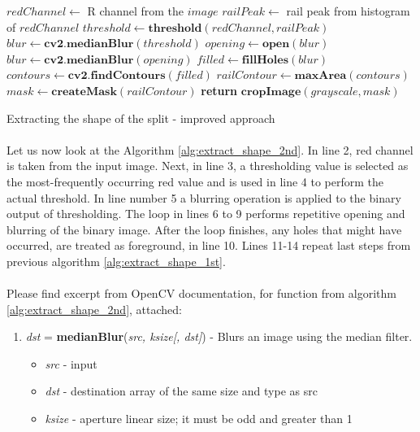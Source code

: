 \begin{algorithm}
	\begin{spacing}{1.5}
	\begin{algorithmic}[1]
			\State $redChannel \gets$ R channel from the $image$
			\State $railPeak \gets$ rail peak from histogram of $redChannel$
			\State $threshold \gets \textbf{threshold}(redChannel, railPeak)$
			\State $blur \gets \textbf{cv2.medianBlur}(threshold)$
				\State $opening \gets \textbf{open}(blur)$
				\State $blur \gets \textbf{cv2.medianBlur}(opening)$
			\EndFor
			\State $filled \gets \textbf{fillHoles}(blur)$
			\State $contours \gets \textbf{cv2.findContours}(filled)$
			\State $railContour \gets \textbf{maxArea}(contours)$
			\State $mask \gets \textbf{createMask}(railContour)$
			\State \textbf{return} $\textbf{cropImage}(grayscale, mask)$
		\EndFunction
	\end{algorithmic}
	\end{spacing}
	\caption{Extracting the shape of the split - improved approach}
	\label{alg:extract_shape_2nd}
\end{algorithm}

\paragraph{}
Let us now look at the Algorithm \ref{alg:extract_shape_2nd}. In line 2, red channel is taken from the input image. Next, in line 3, a thresholding value is selected as the most-frequently occurring red value and is used in line 4 to perform the actual threshold. In line number 5 a blurring operation is applied to the binary output of thresholding. The loop in lines 6 to 9 performs repetitive opening and blurring of the binary image. After the loop finishes, any holes that might have occurred, are treated as foreground, in line 10. Lines 11-14 repeat last steps from previous algorithm \ref{alg:extract_shape_1st}.

\paragraph{}
Please find excerpt from OpenCV documentation, for function from algorithm \ref{alg:extract_shape_2nd}, attached: \cite{opencv-docs}

\begin{enumerate}
	\item \textit{dst} = \textbf{medianBlur}(\textit{src, ksize[, dst]}) - Blurs an image using the median filter. \small{\begin{itemize}
		\item \textit{src} - input
		\item \textit{dst} - destination array of the same size and type as src
		\item \textit{ksize} - aperture linear size; it must be odd and greater than 1
	\end{itemize}}
\end{enumerate}

